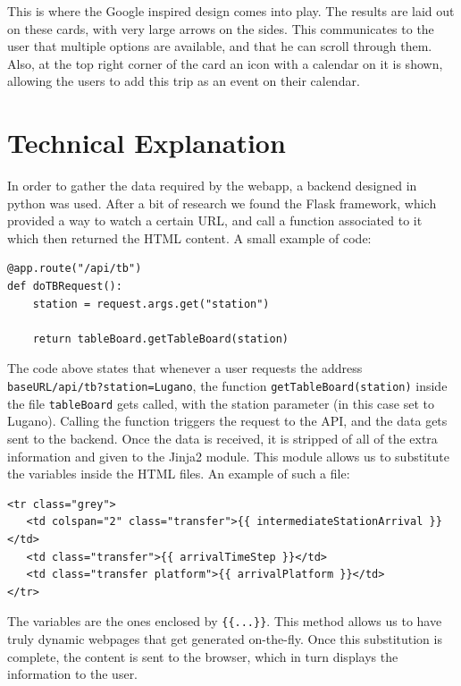 \documentclass[a4paper]{article}
\begin{document}
This is where the Google inspired design comes into play. The results are laid out on these cards, with very large arrows on the sides. This communicates to the user that multiple options are available, and that he can scroll through them. Also, at the top right corner of the card an icon with a calendar on it is shown, allowing the users to add this trip as an event on their calendar. 
\section{Technical Explanation}
In order to gather the data required by the webapp, a backend designed in python was used. After a bit of research we found the Flask framework, which provided a way to watch a certain URL, and call a function associated to it which then returned the HTML content. A small example of code:
\begin{verbatim}
@app.route("/api/tb")
def doTBRequest():
    station = request.args.get("station")

    return tableBoard.getTableBoard(station)
\end{verbatim}
The code above states that whenever a user requests the address \verb+baseURL/api/tb?station=Lugano+, the function \verb+getTableBoard(station)+ inside the file \verb+tableBoard+ gets called, with the station parameter (in this case set to Lugano). Calling the function triggers the request to the API, and the data gets sent to the backend. Once the data is received, it is stripped of all of the extra information and given to the Jinja2 module. This module allows us to substitute the variables inside the HTML files. An example of such a file:
\begin{verbatim}
<tr class="grey">
   <td colspan="2" class="transfer">{{ intermediateStationArrival }}</td>
   <td class="transfer">{{ arrivalTimeStep }}</td>
   <td class="transfer platform">{{ arrivalPlatform }}</td>
</tr>
\end{verbatim}
The variables are the ones enclosed by \verb+{{...}}+. This method allows us to have truly dynamic webpages that get generated on-the-fly. Once this substitution is complete, the content is sent to the browser, which in turn displays the information to the user. 
\end{document}
